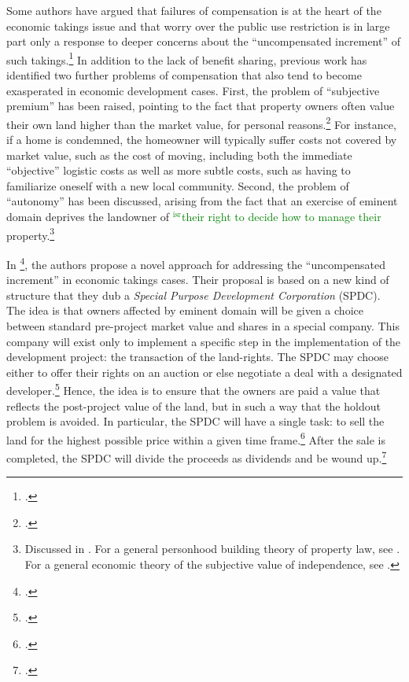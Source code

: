 \documentclass[12pt,a4paper]{book} %
\newcommand{\isr}[1]{\textcolor{green}{$^{\textrm{isr}}${#1}}}
\begin{document}
Some authors have argued that failures of compensation is at the heart of the economic takings issue and that worry over the public use restriction is in large part only a response to deeper concerns about the ``uncompensated increment'' of such takings.\footcite[See][962]{fennell04} In addition to the lack of benefit sharing, previous work has identified two further problems of compensation that also tend to become exasperated in economic development cases. First, the problem of ``subjective premium'' has been raised, pointing to the fact that property owners often value their own land higher than the market value, for personal reasons.\footcite[963]{fennell04} For instance, if a home is condemned, the homeowner will typically suffer costs not covered by market value, such as the cost of moving, including both the immediate ``objective'' logistic costs as well as more subtle costs, such as having to familiarize oneself with a new local community. Second, the problem of ``autonomy'' has been discussed, arising from the fact that an exercise of eminent domain deprives the landowner of \isr{their right to decide how to manage their} property.\footnote{Discussed in \cite[966-967]{fennell04}. For a general personhood building theory of property law, see \cite{radin93}. For a general economic theory of the subjective value of independence, see \cite{benz08}.}

In \footcite{lehavi07}, the authors propose a novel approach for addressing the ``uncompensated increment'' in economic takings cases. Their proposal is based on a new kind of structure that they dub a {\it Special Purpose Development Corporation} (SPDC). The idea is that owners affected by eminent domain will be given a choice between standard pre-project market value and shares in a special company. This company will exist only to implement a specific step in the implementation of the development project: the transaction of the land-rights. The SPDC may choose either to offer their rights on an auction or else negotiate a deal with a designated developer.\footcite[1735]{lehavi07} Hence, the idea is to ensure that the owners are paid a value that reflects the post-project value of the land, but in such a way that the holdout problem is avoided. In particular, the SPDC will have a single task: to sell the land for the highest possible price within a given time frame.\footcite[1741]{lehavi07} After the sale is completed, the SPDC will divide the proceeds as dividends and be wound up.\footcite[1741]{lehavi07}
\end{document}
